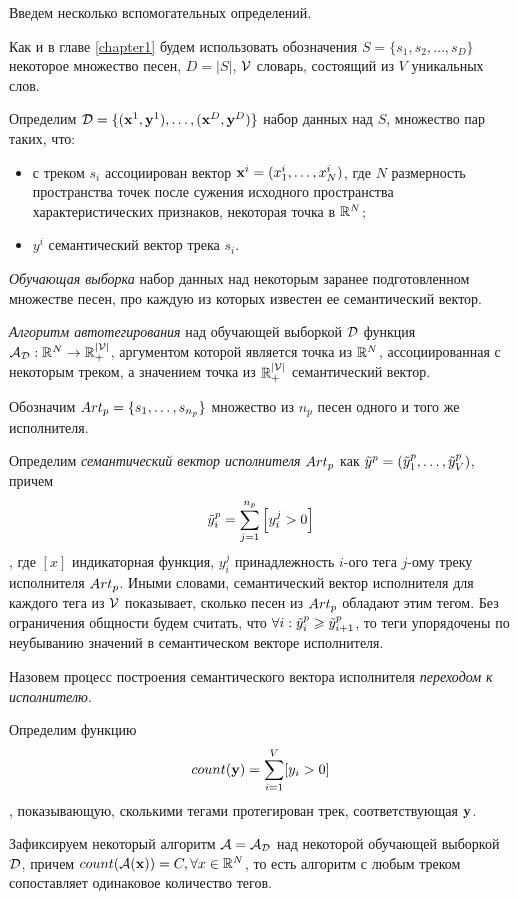 Введем несколько вспомогательных определений.

Как и в главе \ref{chapter1} будем использовать обозначения $S = \{s_1, s_2, \ldots, s_D \}$ \ld некоторое множество песен, $D = |S|$, $ \mathcal{V} $ \ld словарь, состоящий из $V$ уникальных слов.

Определим $\mathcal{D} = \{ (\mathbf{x}^1, \mathbf{y}^1), \ldots, (\mathbf{x}^D, \mathbf{y}^D) \}$ \ld набор данных над $S$, множество пар таких, 
что:
\begin{itemize}
 \item с треком $s_i$ ассоциирован вектор $\mathbf{x}^i = (x^i_1, \ldots, x^i_N)$, где $N$ \ld размерность пространства точек после сужения 
 исходного пространства характеристических признаков, \ld некоторая точка в $\mathbb{R}^N$;
 \item $y^i$ \ld семантический вектор трека $s_i$.
\end{itemize}

\emph{Обучающая выборка} \ld набор данных над некоторым заранее подготовленном множестве песен, про каждую из которых известен ее семантический вектор.

\emph{Алгоритм автотегирования} над обучающей выборкой $\mathcal{D}$ \ld функция ${\mathcal{A}}_{\mathcal{D}} : \mathbb{R}^N \rightarrow \mathbb{R}^{|{\mathcal{V}}|}_{+}$,
аргументом которой является точка из $\mathbb{R}^N$, ассоциированная с некоторым треком, а значением \ld точка из $\mathbb{R}^{|{\mathcal{V}}|}_{+}$ \ld семантический вектор.

Обозначим ${Art}_p = \{s_1, \ldots, s_{n_p} \}$ множество из $n_p$ песен одного и того же исполнителя.

Определим \emph{семантический вектор исполнителя} ${Art}_p$ как $\tilde{y}^p = (\tilde{y}^p_1, \ldots, \tilde{y}^p_{V})$, причем 
$$\tilde{y}^p_i = \sum^{n_p}_{j=1} \left [y^j_i > 0 \right ]$$,
где $[x]$ \ld индикаторная функция, $y^j_i$ \ld принадлежность $i$-ого тега $j$-ому треку исполнителя ${Art}_p$. Иными словами, семантический вектор исполнителя
для каждого тега из $\mathcal{V}$ показывает, сколько песен из ${Art}_p$ обладают этим тегом.
Без ограничения общности будем считать, что $\forall i: \tilde{y}^p_i \geqslant \tilde{y}^p_{i+1}$, то теги упорядочены по неубыванию значений в семантическом векторе исполнителя.

Назовем процесс построения семантического вектора исполнителя \emph{переходом к исполнителю}.

Определим функцию $$count(\mathbf{y}) = \sum^{V}_{i=1} [y_i > 0]$$,
показывающую, сколькими тегами протегирован трек, соответствующая $\mathbf{y}$.

Зафиксируем некоторый алгоритм $\mathcal{A} = \mathcal{A}_{\mathcal{D}}$ над некоторой обучающей выборкой $\mathcal{D}$, причем $count(\mathcal{A}(\mathbf{x})) = C, \forall x \in \mathbb{R}^N$,
то есть алгоритм с любым треком сопоставляет одинаковое количество тегов.

